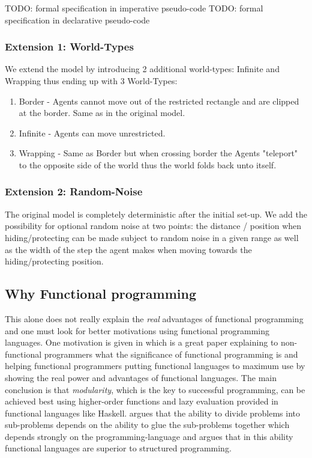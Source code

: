 TODO: formal specification in imperative pseudo-code
TODO: formal specification in declarative pseudo-code 

\subsubsection{Extension 1: World-Types}
We extend the model by introducing 2 additional world-types: Infinite and Wrapping thus ending up with 3 World-Types:

\begin{enumerate}
\item Border - Agents cannot move out of the restricted rectangle and are clipped at the border. Same as in the original model.
\item Infinite - Agents can move unrestricted.
\item Wrapping - Same as Border but when crossing border the Agents "teleport" to the opposite side of the world thus the world folds back unto itself.
\end{enumerate}

\subsubsection{Extension 2: Random-Noise}
The original model is completely deterministic after the initial set-up. We add the possibility for optional random noise at two points: the distance / position when hiding/protecting can be made subject to random noise in a given range as well as the width of the step the agent makes when moving towards the hiding/protecting position.

\subsection{Why Functional programming}
This alone does not really explain the \textit{real} advantages of functional programming and one must look for better motivations using functional programming languages. One motivation is given in \cite{hughes_why_1989} which is a great paper explaining to non-functional programmers what the significance of functional programming is and helping functional programmers putting functional languages to maximum use by showing the real power and advantages of functional languages. The main conclusion is that \textit{modularity}, which is the key to successful programming, can be achieved best using higher-order functions and lazy evaluation provided in functional languages like Haskell. \cite{hughes_why_1989} argues that the ability to divide problems into sub-problems depends on the ability to glue the sub-problems together which depends strongly on the programming-language and \cite{hughes_why_1989} argues that in this ability functional languages are superior to structured programming.

